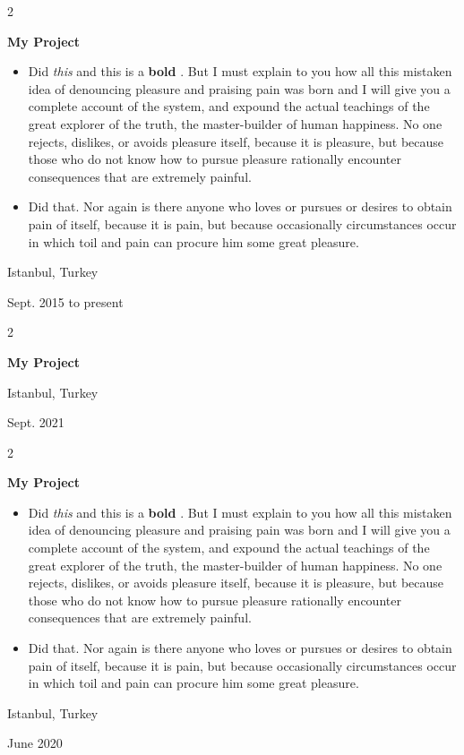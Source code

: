 \documentclass[10pt, letterpaper]{article}
\newenvironment{highlights}{
    \begin{itemize}[
        topsep=0.10 cm,
        parsep=0.10 cm,
        partopsep=0pt,
        itemsep=0pt,
        leftmargin=0.4 cm + 10pt
    ]
}{
    \end{itemize}
} %
\newenvironment{twocolentry}[2][]{
    \onecolentry
    \def\secondColumn{#2}
    \setcolumnwidth{\fill, 4.5 cm}
    \begin{paracol}{2}
}{
    \switchcolumn \raggedleft \secondColumn
    \end{paracol}
    \endonecolentry
} %
\let\hrefWithoutArrow\href
\renewcommand{\href}[2]{\hrefWithoutArrow{#1}{\mbox{\ifthenelse{\equal{#2}{}}{ }{#2 }\raisebox{.15ex}{\footnotesize \faExternalLink*}}}}
\begin{document}
        \begin{twocolentry}{
            Istanbul, Turkey

        Sept. 2015 to present
        }
            \textbf{My Project}
            \begin{highlights}
                \item Did \textit{this} and this is a \textbf{bold} \href{https://example.com}{link}. But I must explain to you how all this mistaken idea of denouncing pleasure and praising pain was born and I will give you a complete account of the system, and expound the actual teachings of the great explorer of the truth, the master-builder of human happiness. No one rejects, dislikes, or avoids pleasure itself, because it is pleasure, but because those who do not know how to pursue pleasure rationally encounter consequences that are extremely painful.
                \item Did that. Nor again is there anyone who loves or pursues or desires to obtain pain of itself, because it is pain, but because occasionally circumstances occur in which toil and pain can procure him some great pleasure.
            \end{highlights}
        \end{twocolentry}


        \vspace{0.2 cm}

        \begin{twocolentry}{
            Istanbul, Turkey

        Sept. 2021
        }
            \textbf{My Project}
        \end{twocolentry}


        \vspace{0.2 cm}

        \begin{twocolentry}{
            Istanbul, Turkey

        June 2020
        }
            \textbf{My Project}
            \begin{highlights}
                \item Did \textit{this} and this is a \textbf{bold} \href{https://example.com}{link}. But I must explain to you how all this mistaken idea of denouncing pleasure and praising pain was born and I will give you a complete account of the system, and expound the actual teachings of the great explorer of the truth, the master-builder of human happiness. No one rejects, dislikes, or avoids pleasure itself, because it is pleasure, but because those who do not know how to pursue pleasure rationally encounter consequences that are extremely painful.
                \item Did that. Nor again is there anyone who loves or pursues or desires to obtain pain of itself, because it is pain, but because occasionally circumstances occur in which toil and pain can procure him some great pleasure.
            \end{highlights}
        \end{twocolentry}
\end{document}
